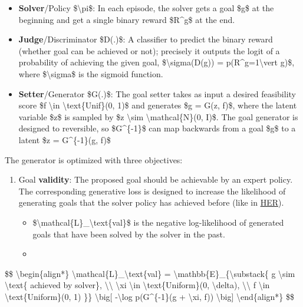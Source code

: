 \begin{itemize}
\tightlist
\item
  \textbf{Solver}/Policy \$\textbackslash pi\$: In each episode, the solver gets a goal \$g\$ at the beginning and get a single binary reward \$R\^{}g\$ at the end.
\item
  \textbf{Judge}/Discriminator \$D(.)\$: A classifier to predict the binary reward (whether goal can be achieved or not); precisely it outputs the logit of a probability of achieving the given goal, \$\textbackslash sigma(D(g)) = p(R\^{}g=1\textbackslash vert g)\$, where \$\textbackslash sigma\$ is the sigmoid function.
\item
  \textbf{Setter}/Generator \$G(.)\$: The goal setter takes as input a desired feasibility score \$f \textbackslash in \textbackslash text\{Unif\}(0, 1)\$ and generates \$g = G(z, f)\$, where the latent variable \$z\$ is sampled by \$z \textbackslash sim \textbackslash mathcal\{N\}(0, I)\$. The goal generator is designed to reversible, so \$G\^{}\{-1\}\$ can map backwards from a goal \$g\$ to a latent \$z = G\^{}\{-1\}(g, f)\$
\end{itemize}

The generator is optimized with three objectives:

\begin{enumerate}
\tightlist
\item
  Goal \textbf{validity}: The proposed goal should be achievable by an expert policy. The corresponding generative loss is designed to increase the likelihood of generating goals that the solver policy has achieved before (like in \href{https://arxiv.org/abs/1707.01495}{HER}).

  \begin{itemize}
  \tightlist
  \item
    \$\textbackslash mathcal\{L\}\_\textbackslash text\{val\}\$ is the negative log-likelihood of generated goals that have been solved by the solver in the past.
  \item
  \end{itemize}
\end{enumerate}

\$\$ \textbackslash begin\{align*\} \textbackslash mathcal\{L\}\_\textbackslash text\{val\} = \textbackslash mathbb\{E\}\_\{\textbackslash substack\{ g \textbackslash sim \textbackslash text\{ achieved by solver\}, \textbackslash\textbackslash{} \textbackslash xi \textbackslash in \textbackslash text\{Uniform\}(0, \textbackslash delta), \textbackslash\textbackslash{} f \textbackslash in \textbackslash text\{Uniform\}(0, 1) \}\} \textbackslash big{[} -\textbackslash log p(G\^{}\{-1\}(g + \textbackslash xi, f)) \textbackslash big{]} \textbackslash end\{align*\} \$\$


